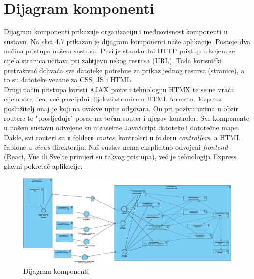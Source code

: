 			\eject
		\section{Dijagram komponenti}
		
        Dijagram komponenti prikazuje organizaciju i međuovisnost komponenti u sustavu. Na slici 4.7 prikazan je dijagram komponenti naše aplikacije. 
        Postoje dva načina pristupa našem sustavu. Prvi je standardni HTTP pristup u kojem se cijela stranica učitava pri zahtjevu nekog resursa (URL). Tada korisnički pretraživač dohvaća sve datoteke potrebne za prikaz jednog resursa (stranice), a to su datoteke vezane za CSS, JS i HTML.
        \newline
        \\
        Drugi način pristupa koristi AJAX poziv i tehnologiju HTMX te se ne vraća cijela stranica, već parcijalni dijelovi stranice u HTML formatu. Express poslužitelj onaj je koji na ovakve upite odgovara. On pri pozivu  uzima u obzir routere te "prosljeđuje" posao na točan router i njegov kontroler. Sve komponente u našem sustavu odvojene su u zasebne JavaScript datoteke i datotečne mape.
        \newline
        \\
        Dakle, svi routeri su u folderu \textit{routes}, kontroleri u folderu \textit{controllers}, a HTML šablone u \textit{views} direktoriju. Naš sustav nema eksplicitno odvojeni \textit{frontend} (React, Vue ili  Svelte primjeri su takvog pristupa), već je tehnologija Express glavni pokretač aplikacije.

        \begin{figure}[H]
            \includegraphics[width=1.1\textwidth]{dijagrami/DijagamKomponenti.jpg} 
            \centering
            \caption{Dijagram komponenti}
            \label{fig:class_diagram}
        \end{figure}	
            
            \eject
			